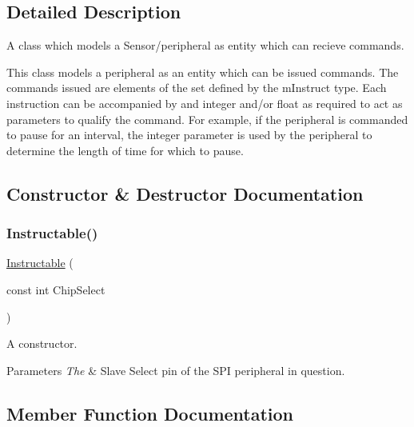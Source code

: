 \subsection{Detailed Description}
A class which models a Sensor/peripheral as entity which can recieve commands. 

This class models a peripheral as an entity which can be issued commands. The commands issued are elements of the set defined by the m\+Instruct type. Each instruction can be accompanied by and integer and/or float as required to act as parameters to qualify the command. For example, if the peripheral is commanded to pause for an interval, the integer parameter is used by the peripheral to determine the length of time for which to pause. 

\subsection{Constructor \& Destructor Documentation}
\mbox{\label{class_instructable_a688587b062ae8f3979bf7567041b86c1}} 
\subsubsection{\texorpdfstring{Instructable()}{Instructable()}}
{\footnotesize\ttfamily \mbox{\hyperlink{class_instructable}{Instructable}} (\begin{DoxyParamCaption}\item[{const int}]{Chip\+Select }\end{DoxyParamCaption})}



A constructor. 


\begin{DoxyParams}{Parameters}
{\em The} & Slave Select pin of the S\+PI peripheral in question. \\
\hline
\end{DoxyParams}


\subsection{Member Function Documentation}
\mbox{\label{class_instructable_a2bdcc11cead0067e963c524968d0d3e1}} 

